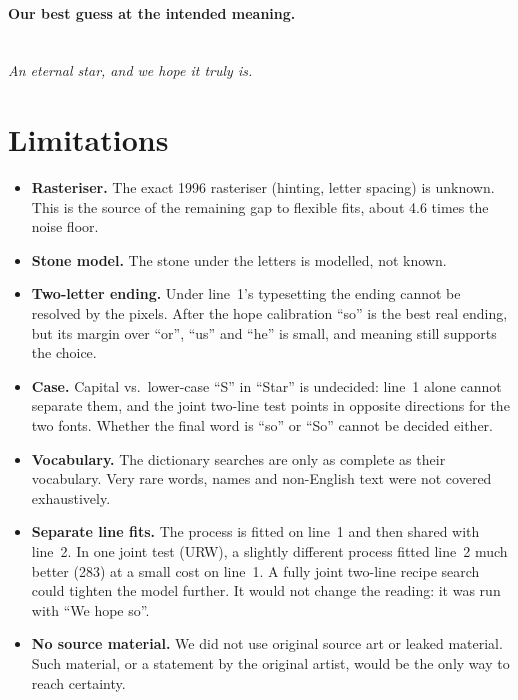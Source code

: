 \documentclass[10pt,a4paper]{article}
\newcommand{\q}[1]{``#1''}
\begin{document}
\paragraph{Our best guess at the intended meaning.}
\begin{center}
\\[2pt]
\emph{An eternal star, and we hope it truly is.}
\end{center}

\section{Limitations}
\label{sec:limits}
\begin{itemize}
\item \textbf{Rasteriser.} The exact 1996 rasteriser (hinting, letter spacing) is unknown. This is the source of the
remaining gap to flexible fits, about 4.6 times the noise floor.
\item \textbf{Stone model.} The stone under the letters is modelled, not known.
\item \textbf{Two-letter ending.} Under line~1's typesetting the ending cannot be resolved by the pixels. After the
hope calibration \q{so} is the best real ending, but its margin over \q{or}, \q{us} and \q{he} is small, and meaning
still supports the choice.
\item \textbf{Case.} Capital vs.\ lower-case \q{S} in \q{Star} is undecided: line~1 alone cannot separate them, and
the joint two-line test points in opposite directions for the two fonts. Whether the final word is \q{so} or \q{So} cannot
be decided either.
\item \textbf{Vocabulary.} The dictionary searches are only as complete as their vocabulary. Very rare words, names and
non-English text were not covered exhaustively.
\item \textbf{Separate line fits.} The process is fitted on line~1 and then shared with line~2. In one joint test (URW), a
slightly different process fitted line~2 much better (283) at a small cost on line~1. A fully joint two-line recipe
search could tighten the model further. It would not change the reading: it was run with \q{We hope so}.
\item \textbf{No source material.} We did not use original source art or leaked material. Such material, or a statement
by the original artist, would be the only way to reach certainty.
\end{itemize}
\end{document}
